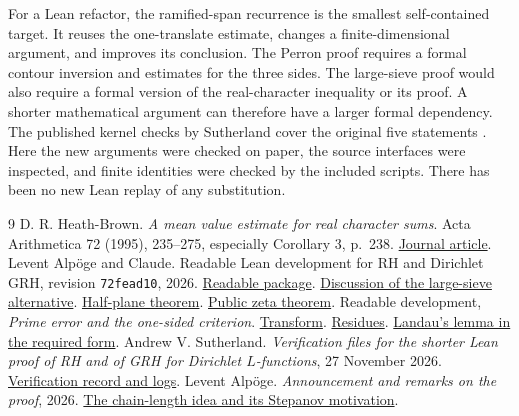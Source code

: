\documentclass[11pt,letterpaper]{article}
\newcommand{\Source}[3]{\href{https://github.com/VladimirReshetnikov/ProveIt/blob/d8415e76ad850651f8c0083afe689dd9f4a45a10/Analysis/GeneralizedRiemannHypothesis/vendor/grh-lean/grh/src/#1.lean\#L#2}{#3}}
\begin{document}
For a Lean refactor, the ramified-span recurrence is the smallest self-contained target. It reuses the one-translate estimate, changes a finite-dimensional argument, and improves its conclusion. The Perron proof requires a formal contour inversion and estimates for the three sides. The large-sieve proof would also require a formal version of the real-character inequality or its proof. A shorter mathematical argument can therefore have a larger formal dependency. The published kernel checks by Sutherland cover the original five statements \cite{checks}. Here the new arguments were checked on paper, the source interfaces were inspected, and finite identities were checked by the included scripts. There has been no new Lean replay of any substitution.

{\small
\begin{thebibliography}{9}
 D. R. Heath-Brown.
\emph{A mean value estimate for real character sums}.
Acta Arithmetica 72 (1995), 235--275, especially Corollary 3, p.~238.
\href{https://doi.org/10.4064/aa-72-3-235-275}{Journal article}.
 Levent Alpöge and Claude. Readable Lean development for RH and Dirichlet GRH, revision \texttt{72fead10}, 2026.
\href{https://github.com/lsernau/grh-lean/tree/72fead102f663d5c7a407964a13dc0cf9d977207/grh}{Readable package}.
\Source{Lib/Analytic/QuadraticTwist}{7}{Discussion of the large-sieve alternative}.
\Source{New/Reduction/OneSidedBound}{239}{Half-plane theorem}.
\Source{Main}{5}{Public zeta theorem}.
 Readable development, \emph{Prime error and the one-sided criterion}.
\Source{New/Reduction/Zeros/PrimeError}{293}{Transform}.
\Source{New/Reduction/Zeros/PrimeError}{414}{Residues}.
\Source{Lib/Analytic/Landau}{217}{Landau's lemma in the required form}.
 Andrew V. Sutherland. \emph{Verification files for the shorter Lean proof of RH and of GRH for Dirichlet $L$-functions}, 27 November 2026.
\href{https://math.mit.edu/~drew/shortgrh/}{Verification record and logs}.
 Levent Alpöge. \emph{Announcement and remarks on the proof}, 2026.
\href{https://alpo.ge/remark.pdf}{The chain-length idea and its Stepanov motivation}.
\end{thebibliography}
}

\clearpage
\appendix

\end{document}
